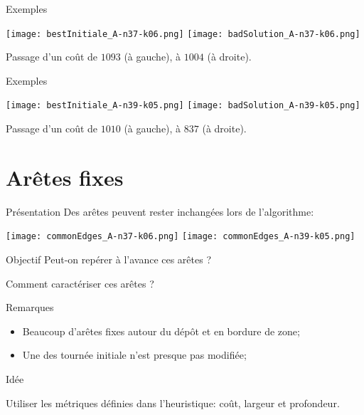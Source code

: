 \documentclass{beamer}
\begin{document}
\begin{frame}{Exemples}
\begin{center}
\texttt{[image: bestInitiale\_A-n37-k06.png]}
\texttt{[image: badSolution\_A-n37-k06.png]}
\end{center}
Passage d'un coût de $1093$ (à gauche), à $1004$ (à droite).
\end{frame}

\begin{frame}{Exemples}
\begin{center}
\texttt{[image: bestInitiale\_A-n39-k05.png]}
\texttt{[image: badSolution\_A-n39-k05.png]}
\end{center}
Passage d'un coût de $1010$ (à gauche), à $837$ (à droite).
\end{frame}

\section{Arêtes fixes}

\begin{frame}{Présentation}
Des arêtes peuvent rester inchangées lors de l'algorithme:

\begin{center}
\texttt{[image: commonEdges\_A-n37-k06.png]}
\texttt{[image: commonEdges\_A-n39-k05.png]}
\end{center}
\begin{block}{Objectif}
Peut-on repérer à l'avance ces arêtes ?
\end{block}

\end{frame}

\begin{frame}{Comment caractériser ces arêtes ?}
\begin{block}{Remarques}
\begin{itemize}
\item Beaucoup d'arêtes fixes autour du dépôt et en bordure de zone;
\item Une des tournée initiale n'est presque pas modifiée;
\end{itemize}
\end{block}

\begin{alertblock}{Idée}

Utiliser les métriques définies dans l'heuristique: coût, largeur et profondeur.

\end{alertblock}
\end{frame}
\end{document}
